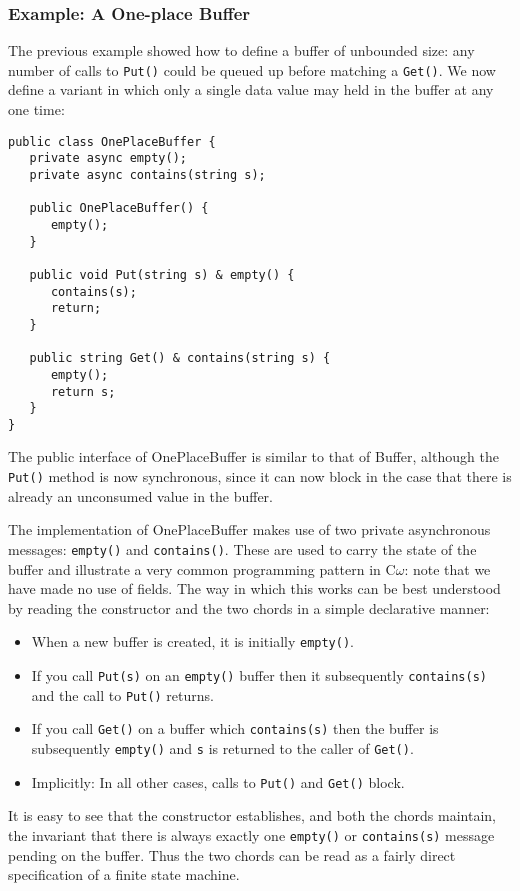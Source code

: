 \documentclass{article}
\newcommand{\comega}{\mbox{C$\omega$}}
\begin{document}
\subsubsection{Example: A One-place Buffer}
The previous example showed how to define a buffer of unbounded size:
any number of calls to \verb|Put()| could be queued up before matching a
\verb|Get()|. We now define a variant in which only a single data value may
held in the buffer at any one time:
\begin{verbatim}
public class OnePlaceBuffer {
   private async empty();
   private async contains(string s);

   public OnePlaceBuffer() {
      empty();
   }

   public void Put(string s) & empty() {
      contains(s);
      return;
   }

   public string Get() & contains(string s) {
      empty();
      return s;
   }
}
\end{verbatim}
The public interface of OnePlaceBuffer is similar to that of Buffer,
although the \verb|Put()| method is now synchronous, since it can now block
in the case that there is already an unconsumed value in the buffer.

The implementation of OnePlaceBuffer makes use of two private
asynchronous messages: \verb|empty()| and \verb|contains()|. These are
used to carry the state of the buffer and illustrate a very common
programming pattern in \comega: note that we have made no use of
fields. The way in which this works can be best understood by reading
the constructor and the two chords in a simple declarative manner:
\begin{itemize}
\item When a new buffer is created, it is initially \verb|empty()|. 
\item If you call \verb|Put(s)| on an \verb|empty()| buffer then it subsequently \verb|contains(s)| and the call to \verb|Put()| returns. 
\item If you call \verb|Get()| on a buffer which \verb|contains(s)| then the buffer is subsequently \verb|empty()| and \verb|s| is returned to the caller of \verb|Get()|. 
\item Implicitly: In all other cases, calls to \verb|Put()| and \verb|Get()| block. 
\end{itemize}
It is easy to see that the constructor establishes, and both the
chords maintain, the invariant that there is always exactly one
\verb|empty()| or \verb|contains(s)| message pending on the
buffer. Thus the two chords can be read as a fairly direct
specification of a finite state machine.
\end{document}
